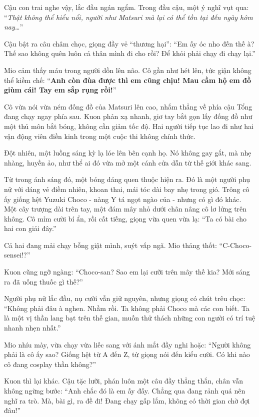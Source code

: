 \documentclass[../main.tex]{subfiles}
\begin{document}
Cậu con trai nghe vậy, lắc đầu ngán ngẩm. Trong đầu cậu, một ý nghĩ vụt qua: ``\textit{Thật không thể hiểu nổi, người như Matsuri mà lại có thể tồn tại đến ngày hôm nay\dots}''

Cậu bật ra câu châm chọc, giọng đầy vẻ ``thương hại'': ``Em ấy óc nho đến thế à? Thế sao không quên luôn cả thân mình đi cho rồi? Để khỏi phải chạy đi chạy lại.''

Mio cảm thấy máu trong người dồn lên não. Cô gần như hét lên, tức giận không thể kiềm chế: ``\textbf{Anh còn đùa được thì em cũng chịu! Mau cầm hộ em đồ giùm cái! Tay em sắp rụng rồi!}''

Cô vừa nói vừa ném đống đồ của Matsuri lên cao, nhắm thẳng về phía cậu Tổng đang chạy ngay phía sau. Kuon phản xạ nhanh, giơ tay bắt gọn lấy đống đồ như một thủ môn bắt bóng, không cần giảm tốc độ. Hai người tiếp tục lao đi như hai vận động viên điền kinh trong một cuộc thi không chính thức.

Đột nhiên, một luồng sáng kỳ lạ lóe lên bên cạnh họ. Nó không gay gắt, mà nhẹ nhàng, huyền ảo, như thể ai đó vừa mở một cánh cửa dẫn từ thế giới khác sang.

Từ trong ánh sáng đó, một bóng dáng quen thuộc hiện ra. Đó là một người phụ nữ với dáng vẻ điềm nhiên, khoan thai, mái tóc dài bay nhẹ trong gió. Trông cô ấy giống hệt Yuzuki Choco - nàng Y tá ngọt ngào của \hll - nhưng có gì đó khác. Một cây trượng dài trên tay, một đám mây nhỏ dưới chân nâng cô lơ lửng trên không. Cô mỉm cười bí ẩn, rồi cất tiếng, giọng vừa quen vừa lạ: ``Ta có bài cho hai con giải đây.''


Cả hai đang mải chạy bỗng giật mình, suýt vấp ngã. Mio thảng thốt: ``C-Choco-sensei!?''

Kuon cũng ngỡ ngàng: ``Choco-san? Sao em lại cưỡi trên mây thế kia? Mới sáng ra đã uống thuốc gì thế?''

Người phụ nữ lắc đầu, nụ cười vẫn giữ nguyên, nhưng giọng có chút trêu chọc: ``Không phải đâu à nghen. Nhầm rồi. Ta không phải Choco mà các con biết. Ta là một vị thần lang bạt trên thế gian, muốn thử thách những con người có trí tuệ nhanh nhẹn nhất.''

Mio nhíu mày, vừa chạy vừa liếc sang với ánh mắt đầy nghi hoặc: ``Người không phải là cô ấy sao? Giống hệt từ A đến Z, từ giọng nói đến kiểu cười. Có khi nào cô đang cosplay thần không?''

Kuon thì lại khác. Cậu tặc lưỡi, phán luôn một câu đầy thẳng thắn, chân vẫn không ngừng bước: ``Anh chắc đó là em ấy đấy. Chẳng qua đang rảnh quá nên nghĩ ra trò. Mà, bài gì, ra đề đi! Đang chạy gấp lắm, không có thời gian chờ đợi đâu!''
\end{document}

